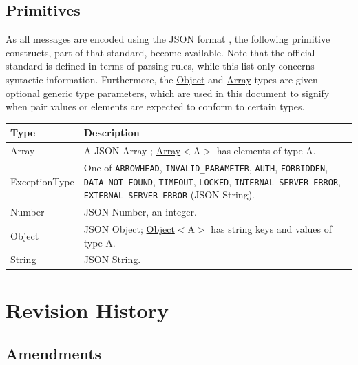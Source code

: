 \documentclass[a4paper]{arrowhead}
\newcommand{\pdef}[1]{{\textcolor{ArrowheadGrey}{#1 \label{sec:model:primitives:#1} \label{sec:model:primitives:#1s}}}}
\newcommand{\pref}[1]{{\textcolor{ArrowheadGrey}{\hyperref[sec:model:primitives:#1]{#1}}}}
\begin{document}
\subsection{Primitives}
\label{sec:model:primitives}

As all messages are encoded using the JSON format \cite{rfc8259}, the following primitive constructs, part of that standard, become available.
Note that the official standard is defined in terms of parsing rules, while this list only concerns syntactic information.
Furthermore, the \pref{Object} and \pref{Array} types are given optional generic type parameters, which are used in this document to signify when pair values or elements are expected to conform to certain types.

\noindent\begin{tabularx}{\textwidth}{| p{4.6cm} | X |} \hline
\rowcolor{gray!33} Type & Description \\ \hline
\pdef{Array} & A JSON Array \cite{rfc8259}; \pref{Array}$<$A$>$ has elements of type A. \\ \hline
\pdef{ExceptionType} & One of \texttt{ARROWHEAD}, \texttt{INVALID\_\allowbreak{}PARAMETER}, \texttt{AUTH}, \texttt{FORBIDDEN}, \texttt{DATA\_\allowbreak{}NOT\_\allowbreak{}FOUND}, \texttt{TIMEOUT}, \texttt{LOCKED}, \texttt{INTERNAL\_\allowbreak{}SERVER\_\allowbreak{}ERROR}, \texttt{EXTERNAL\_\allowbreak{}SERVER\_\allowbreak{}ERROR} (JSON String). \\ \hline
\pdef{Number} & JSON Number, an integer. \\ \hline
\pdef{Object} & JSON Object; \pref{Object}$<$A$>$ has string keys and values of type A. \\ \hline
\pdef{String} & JSON String. \\ \hline
\end{tabularx}

\newpage




\newpage

\section{Revision History}
\subsection{Amendments}
\end{document}
